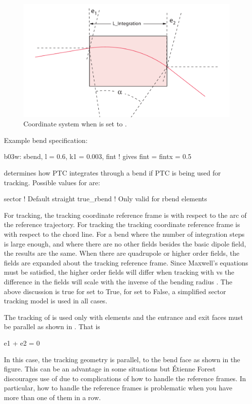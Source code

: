 \begin{figure}[tb]
  \centering
  \includegraphics[width=5in]{true-rbend.pdf}
  \caption[True Rbend coordinates]{Coordinate system when 
is set to .}
  \label{f:true.rbend}
\end{figure}

Example bend specification:
\begin{example}
  b03w: sbend, l = 0.6, k1 = 0.003, fint  ! gives fint = fintx = 0.5
\end{example}


 determines how PTC integrates through a bend
if PTC is being used for tracking. Possible values for
 are:
\begin{example}
  sector      ! Default
  straight
  true_rbend  ! Only valid for rbend elements
\end{example}
For  tracking, the tracking coordinate reference frame is
with respect to the arc of the reference trajectory. For 
tracking the tracking coordinate reference frame is with respect to the
chord line. For a bend where the number of integration steps is large
enough, and where there are no other fields besides the basic dipole
field, the results are the same.  When there are quadrupole or higher
order fields, the fields are expanded about the tracking reference
frame. Since Maxwell's equations must be satisfied, the higher order
fields will differ when tracking with  vs  the
difference in the fields will scale with the inverse of the bending
radius . The above discussion is true for
 set to True, for  set to
False, a simplified sector tracking model is used in all cases.

The  tracking of  is used only
with  elements and the entrance and exit faces must be parallel
as shown in . That is
\begin{example}
  e1 + e2 = 0
\end{example}
In this case, the tracking geometry is parallel, to the bend face as
shown in the figure. This can be an advantage in some situations but
\'Etienne Forest discourages use of  due to complications
of how to handle the reference frames. In particular, how to handle
the reference frames is problematic when you have more than one of
them in a row.

